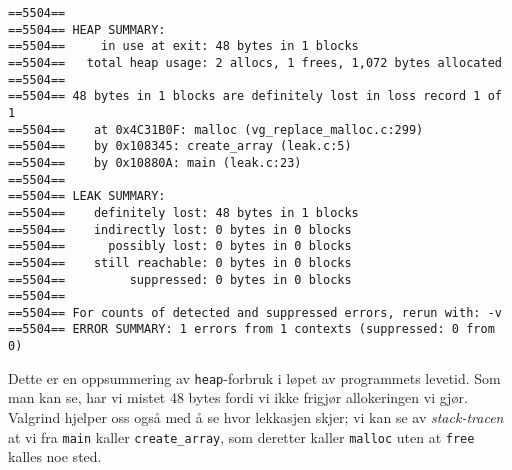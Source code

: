 \begin{lstlisting}[mathescape=true,keywordstyle=\color{black}]
==5504==
==5504== HEAP SUMMARY:
==5504==     in use at exit: 48 bytes in 1 blocks
==5504==   total heap usage: 2 allocs, 1 frees, 1,072 bytes allocated
==5504==
==5504== 48 bytes in 1 blocks are definitely lost in loss record 1 of 1
==5504==    at 0x4C31B0F: malloc (vg_replace_malloc.c:299)
==5504==    by 0x108345: create_array (leak.c:5)
==5504==    by 0x10880A: main (leak.c:23)
==5504==
==5504== LEAK SUMMARY:
==5504==    definitely lost: 48 bytes in 1 blocks
==5504==    indirectly lost: 0 bytes in 0 blocks
==5504==      possibly lost: 0 bytes in 0 blocks
==5504==    still reachable: 0 bytes in 0 blocks
==5504==         suppressed: 0 bytes in 0 blocks
==5504==
==5504== For counts of detected and suppressed errors, rerun with: -v
==5504== ERROR SUMMARY: 1 errors from 1 contexts (suppressed: 0 from 0)

\end{lstlisting}



Dette er en oppsummering av \verb|heap|-forbruk i løpet av programmets levetid. Som man kan se, har vi mistet 48 bytes fordi vi ikke frigjør allokeringen vi gjør. Valgrind hjelper oss også med å se hvor lekkasjen skjer; vi kan se av \textit{stack-tracen} at vi fra \verb|main| kaller \verb|create_array|, som deretter kaller \verb|malloc| uten at \verb|free| kalles noe sted.

